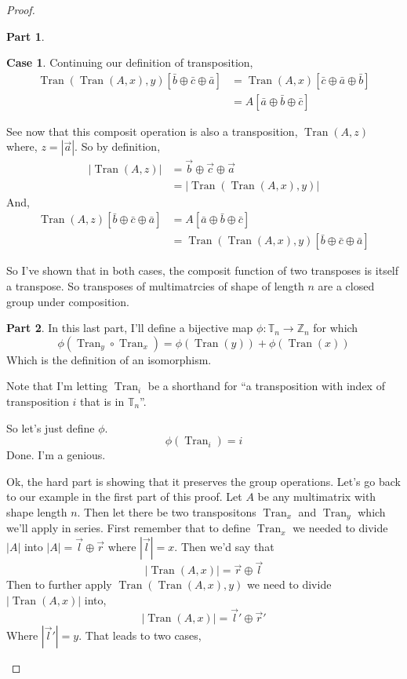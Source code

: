 \documentclass[12pt]{book}
\theoremstyle{plain}
\theoremstyle{definition}
\theoremstyle{ppart}
\newtheorem{ppart}{Part}
\theoremstyle{case}
\newtheorem{case}{Case}
\theoremstyle{solution}
\DeclareMathOperator{\Tran}{Tran}
\begin{document}
\begin{proof}
\begin{ppart}
\begin{case}
Continuing our definition of transposition,
\begin{align*}
  \Tran(\Tran(A, x), y)[\bar{b} \oplus \bar{c} \oplus \bar{a}]
  &=
  \Tran(A, x)[\bar{c} \oplus \bar{a} \oplus \bar{b}] \\
  &=
  A[\bar{a} \oplus \bar{b} \oplus \bar{c}]
\end{align*}

See now that this composit operation is also a transposition, $\Tran(A, z)$ where,
$z = |\vec{a}|$.
So by definition,
\begin{align*}
  |\Tran(A, z)|
  &=
  \vec{b} \oplus \vec{c} \oplus \vec{a} \\
  &=
  |\Tran(\Tran(A, x), y)|  
\end{align*}
And,
\begin{align*}
  \Tran(A, z)[\bar{b} \oplus \bar{c} \oplus \bar{a}]
  &=
  A[\bar{a} \oplus \bar{b} \oplus \bar{c}] \\
  &=
  \Tran(\Tran(A, x), y)[\bar{b} \oplus \bar{c} \oplus \bar{a}]
\end{align*}
\end{case}

So I've shown that in both cases, the composit function of two transposes is
itself a transpose. So transposes of multimatrcies of shape of length $n$ are
a closed group under composition.
\end{ppart}

\begin{ppart}
In this last part, I'll define a bijective map
$\phi: \mathbb{T}_n \to \mathbb{Z}_n$ for which
\[ \phi(\Tran_y \circ \Tran_x) = \phi(\Tran(y)) + \phi(\Tran(x)) \]
Which is the definition of an isomorphism.

Note that I'm letting $\Tran_i$ be a shorthand for ``a transposition
with index of transposition $i$ that is in $\mathbb{T}_n$''.

So let's just define $\phi$.
\[ \phi(\Tran_i) = i \]
Done. I'm a genious.

Ok, the hard part is showing that it preserves the group operations.
Let's go back to our example in the first part of this proof. Let $A$ be
any multimatrix with shape length $n$. Then let there be two transpositons
$\Tran_x$ and $\Tran_y$ which we'll apply in series. First remember that
to define $\Tran_x$ we needed to divide $|A|$ into $|A| = \vec{l} \oplus \vec{r}$
where $|\vec{l}| = x$. Then we'd say that
\[ |\Tran(A, x)| = \vec{r} \oplus \vec{l} \]
Then to further apply $\Tran(\Tran(A, x), y)$ we need to divide $|\Tran(A,x)|$
into,
\[ |\Tran(A, x)| = \vec{l}' \oplus \vec{r}' \]
Where $|\vec{l}'| = y$.
That leads to two cases,


\end{ppart}
\end{proof}
\end{document}
